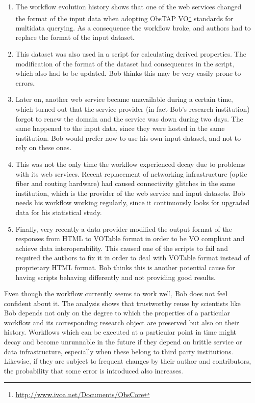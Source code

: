 \begin{enumerate}
\def\labelenumi{\arabic{enumi}.}
\itemsep1pt\parskip0pt
\item
  The workflow evolution history shows that one of the web services
  changed the format of the input data when adopting ObsTAP VO\footnote{\url{http://www.ivoa.net/Documents/ObsCore}}
  standards for multidata querying. As a consequence the workflow broke,
  and authors had to replace the format of the input dataset.
\item
  This dataset was also used in a script for calculating derived
  properties. The modification of the format of the dataset had
  consequences in the script, which also had to be updated. Bob thinks
  this may be very easily prone to errors.
\item
  Later on, another web service became unavailable during a certain
  time, which turned out that the service provider (in fact Bob's
  research institution) forgot to renew the domain and the service was
  down during two days. The same happened to the input data, since they
  were hosted in the same institution. Bob would prefer now to use his
  own input dataset, and not to rely on these ones.
\item
  This was not the only time the workflow experienced decay due to
  problems with its web services. Recent replacement of networking
  infrastructure (optic fiber and routing hardware) had caused
  connectivity glitches in the same institution, which is the provider
  of the web service and input datasets. Bob needs his workflow working
  regularly, since it continuously looks for upgraded data for his
  statistical study.
\item
  Finally, very recently a data provider modified the output format of
  the responses from HTML to VOTable format in order to be VO compliant
  and achieve data interoperability. This caused one of the scripts to
  fail and required the authors to fix it in order to deal with VOTable
  format instead of proprietary HTML format. Bob thinks this is another
  potential cause for having scripts behaving differently and not
  providing good results.
\end{enumerate}

Even though the workflow currently seems to work well, Bob does not feel
confident about it. The analysis shows that trustworthy reuse by
scientists like Bob depends not only on the degree to which the
properties of a particular workflow and its corresponding research
object are preserved but also on their history. Workflows which can be
executed at a particular point in time might decay and become unrunnable
in the future if they depend on brittle service or data infrastructure,
especially when these belong to third party institutions. Likewise, if
they are subject to frequent changes by their author and contributors,
the probability that some error is introduced also increases.

